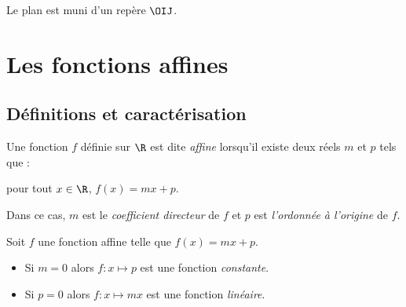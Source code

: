 %
%
\begin{centered}
Le plan est muni d'un repère $\OIJ$.
\end{centered}
%
%
%
%
\section{Les fonctions affines}
%
%
\subsection{Définitions et caractérisation}
%
%
%
\begin{dfn}
Une fonction $f$ définie sur $\R$ est dite \emph{affine} lorsqu'il existe deux réels $m$ et $p$  tels que :
    \begin{centered}
    pour tout $x \in \R$, $f(x)=mx+p$.
    \end{centered}
 
Dans ce cas, $m$ est le \emph{coefficient directeur} de $f$ et $p$ est \emph{l'ordonnée à l'origine} de $f$.
\end{dfn}
%
%
%
\begin{dfn} Soit $f$ une fonction affine telle que $f(x)=mx+p$.
\begin{itemize}
\item Si $m=0$ alors $f\colon x\mapsto p$ est une fonction \emph{constante}.
\item Si $p=0$ alors $f\colon x\mapsto mx$ est une fonction \emph{linéaire}.
\end{itemize}
\end{dfn}
%
%
% 
%
%
